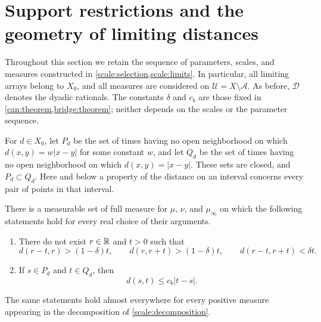 \section{Support restrictions and the geometry of limiting distances}
\label{shape:section}

Throughout this section we retain the sequence of parameters, scales, and
measures constructed in \cref{scale:selection,scale:limits}.  In particular,
all limiting arrays belong to $X_0$, and all measures are considered on
$\mathcal U=X\setminus\mathcal A$.  As before, $\mathcal D$ denotes the
dyadic rationals.  The constants $\delta$ and $c_b$ are those fixed in
\cref{can:theorem,bridge:theorem}; neither depends on the scales or the
parameter sequence.

For $d\in X_0$, let $P_d$ be the set of times having no open neighborhood
on which $d(x,y)=w|x-y|$ for some constant $w$, and let $Q_d$ be the set
of times having no open neighborhood on which $d(x,y)=|x-y|$.
These sets are closed, and $P_d\subset Q_d$.  Here and below a property of
the distance on an interval concerns every pair of points in that interval.

\begin{proposition}\label{shape:exclusions}
There is a measurable set of full measure for $\mu$, $\nu$, and
$\mu_\infty$ on which the following statements hold for every real choice
of their arguments.
\begin{enumerate}
\item There do not exist $r\in\mathbb{R}$ and $t>0$ such that
\begin{equation}\label{shape:forbidden-triple}
 d(r-t,r)>(1-\delta)t,\qquad
 d(r,r+t)>(1-\delta)t,\qquad
 d(r-t,r+t)<\delta t.
\end{equation}
\item If $s\in P_d$ and $t\in Q_d$, then
\begin{equation}\label{shape:slow-pair}
 d(s,t)\le c_b|t-s|.
\end{equation}
\end{enumerate}
The same statements hold almost everywhere for every positive measure
appearing in the decomposition of \cref{scale:decomposition}.
\end{proposition}


